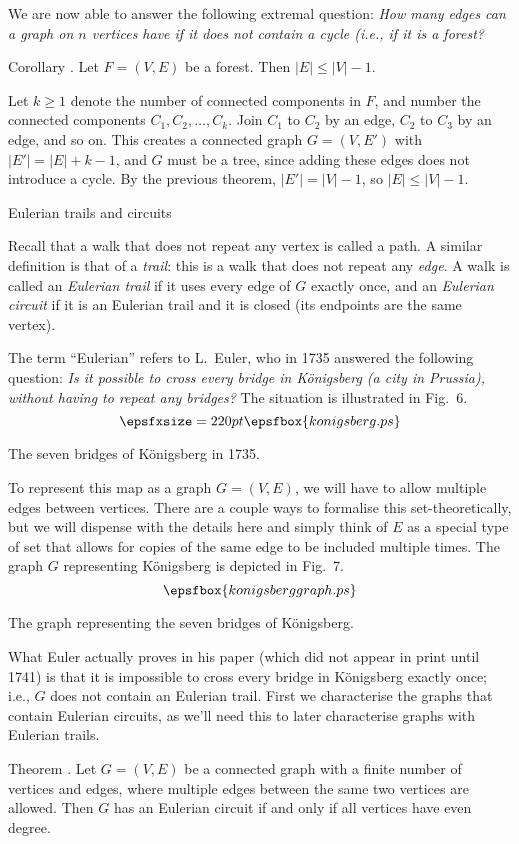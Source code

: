 We are now able to answer the following extremal question: {\sl How many edges can a graph
on $n$ vertices have if it does not contain a cycle (i.e., if it is a forest?}

\proclaim Corollary \advthm. Let $F = (V,E)$ be a forest. Then $|E| \le |V|-1$.

\proof Let $k\ge 1$ denote the number of connected components in $F$, and number the
connected components $C_1, C_2,\ldots,C_k$.
Join $C_1$ to $C_2$ by an edge, $C_2$ to $C_3$ by an
edge, and so on. This creates a connected graph $G = (V, E')$ with $|E'| = |E| + k-1$, and $G$ must
be a tree, since adding these edges does not introduce a cycle. By the previous
theorem, $|E'| = |V|-1$, so $|E| \le |V|-1$.\slug

\advsect Eulerian trails and circuits

Recall that a walk that does not repeat any vertex is called a path. A similar definition
is that of a {\it trail}: this is a walk that does not repeat any {\it edge}.
A walk is called an {\it Eulerian trail} if it uses every edge of $G$ exactly once, and an
{\it Eulerian circuit} if it is an Eulerian trail and it is closed (its endpoints are
the same vertex).

The term ``Eulerian'' refers to L.~Euler, who in 1735 answered the following question:
{\sl Is it possible to cross every bridge in K\"onigsberg (a city in Prussia),
without having to repeat any bridges?} The situation is illustrated in Fig.~6.
\midinsert
$$\epsfxsize=220pt\epsfbox{konigsberg.ps}$$
\vskip5pt
\caption{The seven bridges of K\"onigsberg in 1735.}
\endinsert
\goodbreak
To represent this map as a graph $G = (V,E)$, we will have to allow multiple edges between vertices.
There are a couple ways to formalise this set-theoretically, but we will dispense with the details
here and simply think of $E$ as a special type of set
that allows for copies of the same edge to be included multiple times. The graph $G$ representing
K\"onigsberg is depicted in Fig.~7.
\midinsert
$$\epsfbox{konigsberggraph.ps}$$
\vskip5pt
\caption{The graph representing the seven bridges of K\"onigsberg.}
\endinsert
\goodbreak
What Euler actually proves in his paper (which did not appear in print until 1741) is that
it is impossible to cross every bridge in K\"onigsberg exactly once; i.e., $G$ does not
contain an Eulerian trail.
First we characterise the graphs that contain Eulerian circuits, as we'll need this to later
characterise graphs with Eulerian trails.

\proclaim Theorem \advthm. Let $G = (V,E)$ be a connected graph with a finite number of vertices
and edges, where multiple edges between the same two vertices are allowed. Then
$G$ has an Eulerian circuit if and only if all vertices have even degree.

